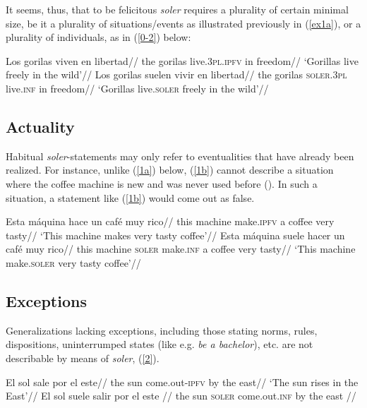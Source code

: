 \documentclass{cascadilla-xelatex-biblatex}
\begin{document}
	It seems, thus, that to be felicitous \textit{soler} requires a plurality of certain minimal size, be it a plurality of situations/events as illustrated previously in (\ref{ex1a}), or a plurality of individuals, as in (\ref{0-2}) below:
	
	
	\pex\label{0-2}
	\a\begingl
	\gla Los gorilas viven en libertad//
	\glb the gorilas live.\textsc{3pl.ipfv} in freedom//
	\glft `Gorillas live freely in the wild'//
	\endgl
	\a\begingl
	\gla Los gorilas suelen vivir en libertad//
	\glb the gorilas \textsc{soler.3pl} live.\textsc{inf} in freedom//
	\glft `Gorillas live.\textsc{soler} freely in the wild'//
	\endgl
	\xe

	\vspace{-\baselineskip}
	
	\subsection{Actuality}\label{actuality}
	
	Habitual \textit{soler}-statements may only refer to eventualities that have already been realized. For instance, unlike (\ref{1a}) below, (\ref{1b}) cannot describe a situation where the coffee machine is new and was never used before (\cite{Green:2000}). In such a situation, a statement like (\ref{1b}) would come out as false.
	
	\pex
	\a\label{1a}\begingl
	\gla Esta m{\'a}quina hace un caf{\'e} muy rico//
	\glb this machine make.\textsc{ipfv} a coffee very tasty//
	\glft `This machine makes very tasty coffee'//
	\endgl
	\a\label{1b}\begingl
	\gla Esta m{\'a}quina suele hacer un caf{\'e} muy rico//
	\glb this machine \textsc{soler} make.\textsc{inf} a coffee very tasty//
	\glft `This machine make.\textsc{soler} very tasty coffee'//
	\endgl
	\xe

	\vspace{-\baselineskip}
	
	\subsection{Exceptions}\label{exceptions}
	
	Generalizations lacking exceptions, including those stating norms, rules, dispositions, uninterrumped states (like e.g. \textit{be a bachelor}), etc. are not describable by means of \textit{soler}, (\ref{2}). 
	
	
	\pex\label{2}
	\a\label{2a}\begingl
	\gla El sol sale por el este//
	\glb the sun come.out-\textsc{ipfv} by the east//
	\glft `The sun rises in the East'//
	\endgl
	\a\label{2b}\begingl
	\gla\ljudge{\#}El sol suele salir por el este //
	\glb the sun \textsc{soler} come.out.\textsc{inf} by the east //
	\endgl
	\xe
	
\end{document}
